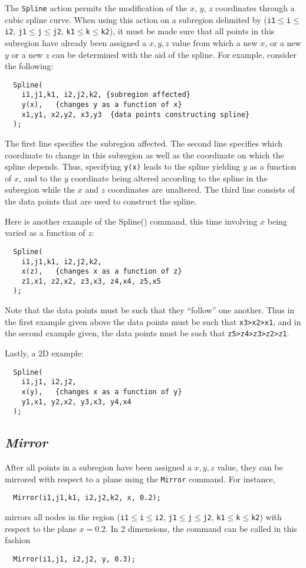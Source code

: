 \documentclass{warpdoc}
\begin{document}
The \verb|Spline| action permits the modification of the $x$, $y$, $z$ coordinates
through a cubic spline curve. 
When using this action on a subregion delimited by
(\verb|i1|$\leq$\verb|i|$\leq$\verb|i2|,
  \verb|j1|$\leq$\verb|j|$\leq$\verb|j2|,
  \verb|k1|$\leq$\verb|k|$\leq$\verb|k2|),
it must be made sure that all points in this subregion have already been
assigned a $x, y, z$ value from which a new $x$, or a new $y$ or a
new $z$ can be determined with the aid of the spline.
For example, consider the following:
%
\begin{verbatim}
  Spline(
    i1,j1,k1, i2,j2,k2, {subregion affected}
    y(x),   {changes y as a function of x}
    x1,y1, x2,y2, x3,y3  {data points constructing spline}
  );
\end{verbatim}
%
The first line specifies the subregion affected. 
The second line  specifies  which coordinate to change in this subregion as well as the coordinate on which the spline depends. Thus, specifying \verb|y(x)| leads to the spline yielding $y$ as a function of $x$, and to the $y$ coordinate being altered according to the spline in the subregion while the $x$ and $z$ coordinates are unaltered. 
The third line consists of the data points that are used to construct the spline.

Here is another example of the Spline() command, this time involving
$x$ being varied as a function of $z$:
%
\begin{verbatim}
  Spline(
    i1,j1,k1, i2,j2,k2,
    x(z),   {changes x as a function of z}
    z1,x1, z2,x2, z3,x3, z4,x4, z5,x5  
  );
\end{verbatim}
%
Note that the data points must be such that they ``follow'' one another. Thus in the first example given above the data points must be such that \verb|x3>x2>x1|, and in the second example given, the data points must be such that \verb|z5>z4>z3>z2>z1|.

Lastly, a 2D example:
%
\begin{verbatim}
  Spline(
    i1,j1, i2,j2,
    x(y),   {changes x as a function of y}
    y1,x1, y2,x2, y3,x3, y4,x4  
  );
\end{verbatim}
%



\subsection{\emph{Mirror}}

After all points in a subregion have been assigned
a  $x,y,z$ value, they can be mirrored with respect to a plane using the \verb|Mirror| command. For instance,
%
\begin{verbatim}
  Mirror(i1,j1,k1, i2,j2,k2, x, 0.2);
\end{verbatim}
%
mirrors all nodes in the region
(\verb|i1|$\leq$\verb|i|$\leq$\verb|i2|,
  \verb|j1|$\leq$\verb|j|$\leq$\verb|j2|,
  \verb|k1|$\leq$\verb|k|$\leq$\verb|k2|)
with respect to the plane  $x=0.2$.
In 2 dimensions, the command can be called in this fashion
%
\begin{verbatim}
  Mirror(i1,j1, i2,j2, y, 0.3);
\end{verbatim}
%
\end{document}
